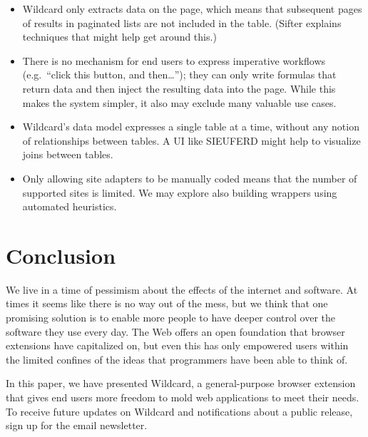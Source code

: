 \documentclass[english,submission]{programming}
\providecommand{\tightlist}{%
  \setlength{\itemsep}{0pt}\setlength{\parskip}{0pt}}
\begin{document}
\begin{itemize}
\tightlist
\item
  Wildcard only extracts data on the page, which means that subsequent
  pages of results in paginated lists are not included in the table.
  (Sifter explains \autocite{huynh2006} techniques that might help get
  around this.)
\item
  There is no mechanism for end users to express imperative workflows
  (e.g.~``click this button, and then\ldots{}''); they can only write
  formulas that return data and then inject the resulting data into the
  page. While this makes the system simpler, it also may exclude many
  valuable use cases.
\item
  Wildcard's data model expresses a single table at a time, without any
  notion of relationships between tables. A UI like SIEUFERD
  \autocite{bakke2016} might help to visualize joins between tables.
\item
  Only allowing site adapters to be manually coded means that the number
  of supported sites is limited. We may explore also building wrappers
  using automated heuristics.
\end{itemize}

\hypertarget{conclusion}{%
\section{Conclusion}\label{conclusion}}

We live in a time of pessimism about the effects of the internet and
software. At times it seems like there is no way out of the mess, but we
think that one promising solution is to enable more people to have
deeper control over the software they use every day. The Web offers an
open foundation that browser extensions have capitalized on, but even
this has only empowered users within the limited confines of the ideas
that programmers have been able to think of.

In this paper, we have presented Wildcard, a general-purpose browser
extension that gives end users more freedom to mold web applications to
meet their needs. To receive future updates on Wildcard and
notifications about a public release, sign up for the email newsletter.

\acks
\printbibliography
\end{document}
